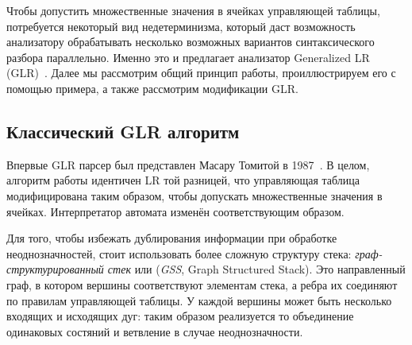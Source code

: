 Чтобы допустить множественные значения в ячейках управляющей таблицы, потребуется некоторый вид недетерминизма, который даст возможность анализатору обрабатывать несколько возможных вариантов синтаксического разбора параллельно. Именно это и предлагает анализатор Generalized LR (GLR)~\cite{tomita-1987-efficient}. Далее мы рассмотрим общий принцип работы, проиллюстрируем его с помощью примера, а также рассмотрим модификации GLR.

\subsection{Классический GLR алгоритм}

Впервые GLR парсер был представлен Масару Томитой в 1987~\cite{tomita-1987-efficient}. В целом, алгоритм работы идентичен LR той разницей, что управляющая таблица модифицирована таким образом, чтобы допускать множественные значения в ячейках. Интерпретатор автомата изменён соответствующим образом.

Для того, чтобы избежать дублирования информации при обработке неоднозначностей, стоит использовать более сложную структуру стека: \textit{граф-структурированный стек} или (\textit{GSS}, Graph Structured Stack). Это направленный граф, в котором вершины соответствуют элементам стека, а ребра их соединяют по правилам управляющей таблицы. У каждой вершины может быть несколько входящих и исходящих дуг: таким образом реализуется то объединение одинаковых состяний и ветвление в случае неоднозначности.

